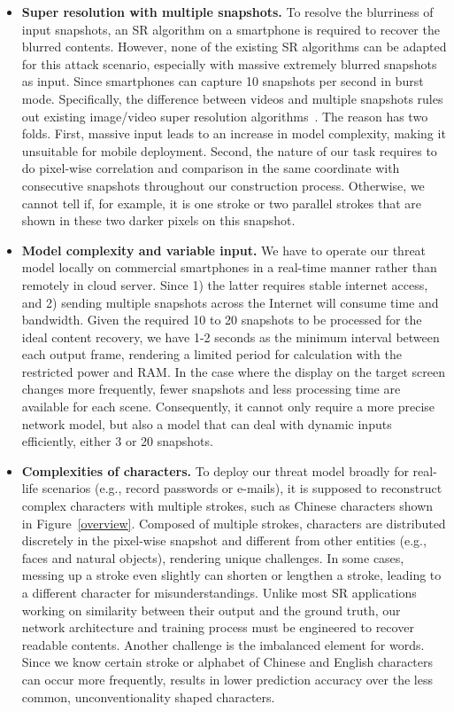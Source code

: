 \begin{itemize}[leftmargin=*]
  \item \textbf{Super resolution with multiple snapshots.} To resolve the blurriness of input snapshots, an SR algorithm on a smartphone is required to recover the blurred contents. However, none of the existing SR algorithms can be adapted for this attack scenario, especially with massive extremely blurred snapshots as input. Since smartphones can capture 10 snapshots per second in burst mode. Specifically, the difference between videos and multiple snapshots rules out existing image/video super resolution algorithms~\cite{lucas2019generative,kappeler2016video}. The reason has two folds. First, massive input leads to an increase in model complexity, making it unsuitable for mobile deployment. Second, the nature of our task requires to do pixel-wise correlation and comparison in the same coordinate with consecutive snapshots throughout our construction process. Otherwise, we cannot tell if, for example, it is one stroke or two parallel strokes that are shown in these two darker pixels on this snapshot.
  \item \textbf{Model complexity and variable input.} We have to operate our threat model locally on commercial smartphones in a real-time manner rather than remotely in cloud server. Since 1) the latter requires stable internet access, and 2) sending multiple snapshots across the Internet will consume time and bandwidth. Given the required 10 to 20 snapshots to be processed for the ideal content recovery, we have 1-2 seconds as the minimum interval between each output frame, rendering a limited period for calculation with the restricted power and RAM. In the case where the display on the target screen changes more frequently, fewer snapshots and less processing time are available for each scene. Consequently, it cannot only require a more precise network model, but also a model that can deal with dynamic inputs efficiently, either 3 or 20 snapshots.
  \item \textbf{Complexities of characters.} To deploy our threat model broadly for real-life scenarios (e.g., record passwords or e-mails), it is supposed to reconstruct complex characters with multiple strokes, such as Chinese characters shown in Figure~\ref{overview}. Composed of multiple strokes, characters are distributed discretely in the pixel-wise snapshot and different from other entities (e.g., faces and natural objects), rendering unique challenges. In some cases, messing up a stroke even slightly can shorten or lengthen a stroke, leading to a different character for misunderstandings. Unlike most SR applications working on similarity between their output and the ground truth, our network architecture and training process must be engineered to recover readable contents. Another challenge is the imbalanced element for words. Since we know certain stroke or alphabet of Chinese and English characters can occur more frequently, results in lower prediction accuracy over the less common, unconventionality shaped characters.
\end{itemize}

